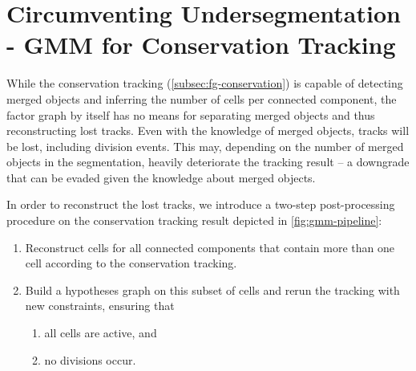 \chapter{Circumventing Undersegmentation - GMM for Conservation Tracking}
\label{cha:GMM}

While the conservation tracking (\cref{subsec:fg-conservation}) is capable of detecting merged
objects and inferring the number of cells per connected component, the factor graph by itself has no
means for separating merged objects and thus reconstructing lost tracks.  Even with the knowledge of
merged objects, tracks will be lost, including division events. This may, depending on the number of
merged objects in the segmentation, heavily deteriorate the tracking result -- a downgrade that can
be evaded given the knowledge about merged objects.

In order to reconstruct the lost tracks, we introduce a two-step post-processing procedure on the
conservation tracking result depicted in \cref{fig:gmm-pipeline}:
\begin{enumerate}
      \item Reconstruct cells for all connected components that contain more than one cell according
    to the conservation tracking.
      \item Build a hypotheses graph on this subset of cells and rerun the tracking with new
    constraints, ensuring that \label{itm:gmm-new-constraints}
    \begin{enumerate}
          \item all cells are active, and \label{itm:gmm-all-cells-active}
          \item no divisions occur. \label{itm:gmm-no-divisions}
    \end{enumerate}
\end{enumerate}

